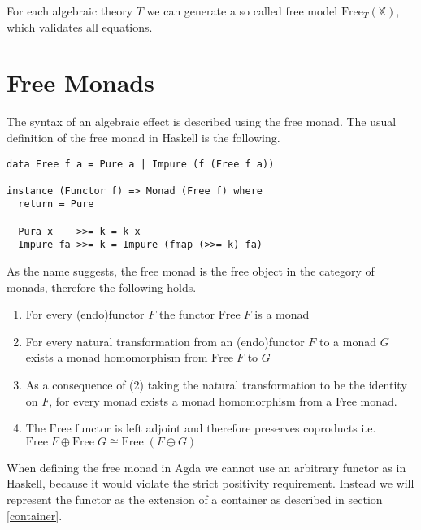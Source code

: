 For each algebraic theory $T$ we can generate a so called free model
$\mathrm{Free}_T(\mathbb{X})$, which validates all equations.


\section{Free Monads}
\label{fo-free-monads}

The syntax of an algebraic effect is described using the free monad.
The usual definition of the free monad in Haskell is the following.

\begin{verbatim}
data Free f a = Pure a | Impure (f (Free f a))

instance (Functor f) => Monad (Free f) where
  return = Pure

  Pura x    >>= k = k x
  Impure fa >>= k = Impure (fmap (>>= k) fa)
\end{verbatim}
As the name suggests, the free monad is the free object in the category of
monads, therefore the following holds.

\begin{enumerate}
  \item For every (endo)functor $F$ the functor $\mathrm{Free}\;F$ is a monad
  \item For every natural transformation from an (endo)functor $F$ to a monad $G$
    exists a monad homomorphism from $\mathrm{Free}\;F$ to $G$
  \item As a consequence of (2) taking the natural transformation to be the
    identity on $F$, for every monad exists a monad homomorphism from a
    Free monad.
  \item The $\mathrm{Free}$ functor is left adjoint and therefore preserves
    coproducts i.e. $\mathrm{Free}\;F \oplus \mathrm{Free}\; G \cong \mathrm{Free}\;
    (F \oplus G)$
\end{enumerate}
When defining the free monad in Agda we cannot use an arbitrary functor as in
Haskell, because it would violate the strict positivity requirement.
Instead we will represent the functor as the extension of a container as
described in section \ref{container}.

